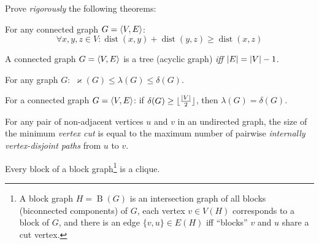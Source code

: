 \documentclass[a4paper,12pt]{article}
\newcommand{\op}[1]{\operatorname*{#1}}
\newcommand{\minDegree}[1]{\delta(#1)}
\newcommand{\vertexConnectivity}[1]{\varkappa(#1)}
\newcommand{\edgeConnectivity}[1]{\lambda(#1)}
\newcommand{\dist}[1]{\op{dist}(#1)}
\newcommand{\blockGraph}[1]{\op{B}(#1)}
\begin{document}
\begin{tasks}
    \item Prove \emph{rigorously} the following theorems:
    
    \begin{theorem}
        For any connected graph $G = \langle V, E\rangle$:
        $$\forall x, y, z \in V: \dist{x, y} + \dist{y, z} \geq \dist{x, z}$$
    \end{theorem}

    \begin{theorem}[Tree]
        A connected graph $G = \langle V, E\rangle$ is a tree (\ie acyclic graph) \emph{iff} $\left|E\right| = \left|V\right| - 1$.
    \end{theorem}

    \begin{theorem}[Whitney]
        For any graph $G:$ $\vertexConnectivity{G} \leq \edgeConnectivity{G} \leq \minDegree{G}$.
    \end{theorem}

    \begin{theorem}[Chartrand]
        For a connected graph $G = \langle V, E\rangle$: if $\minDegree{G} \geq \floor{\frac{\card{V}}{2}}$, then $\edgeConnectivity{G} = \minDegree{G}$. 
    \end{theorem}

    \begin{theorem}[Menger]
        For any pair of non-adjacent vertices $u$ and $v$ in an undirected graph, the size of the minimum \textit{vertex cut} is equal to the maximum number of pairwise \textit{internally vertex-disjoint paths} from $u$ to $v$.
    \end{theorem}

    \begin{theorem}[Harary]
        Every block of a block graph\footnote{A block graph $H = \blockGraph{G}$ is an intersection graph of all blocks (biconnected components) of $G$, \ie each vertex $v \in V(H)$ corresponds to a block of $G$, and there is an edge $\{v, u\} \in E(H)$ iff \enquote{blocks} $v$ and $u$ share a cut vertex.} is a clique.
    \end{theorem}

\end{tasks}
\end{document}
